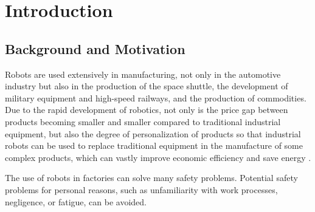 \chapter{Introduction} \label{ch:Introduction}

%
%
%

\newtheorem{definition}{Definition}
\section{Background and Motivation} \label{sec:Introduction:Background}

Robots are used extensively in manufacturing, not only in the automotive industry but also in the production of the space shuttle, the development of military equipment and high-speed railways, and the production of commodities. Due to the rapid development of robotics, not only is the price gap between products becoming smaller and smaller compared to traditional industrial equipment, but also the degree of personalization of products so that industrial robots can be used to replace traditional equipment in the manufacture of some complex products, which can vastly improve economic efficiency and save energy \cite{EEUIR}.

The use of robots in factories can solve many safety problems. Potential safety problems for personal reasons, such as unfamiliarity with work processes, negligence, or fatigue, can be avoided.

